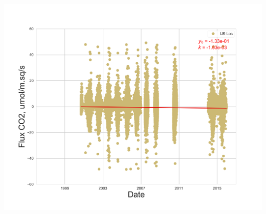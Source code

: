 \documentclass{beamer}
\begin{document}
\begin{frame}
\begin{columns}[t]
\includegraphics[width=\textwidth]{FvsTime/US-Los.png}
\end{columns}

\end{frame}
\end{document}
